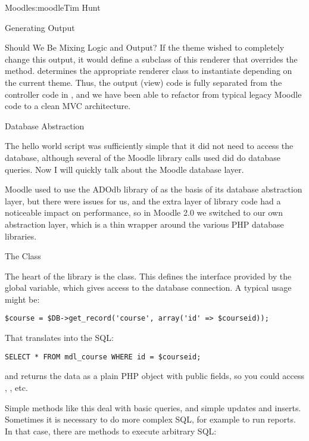 \begin{aosachapter}{Moodle}{s:moodle}{Tim Hunt}
\begin{aosasect1}{Generating Output}
\begin{aosasect2}{Should We Be Mixing Logic and Output?}
If the theme wished to completely change this output, it would define
a subclass of this renderer that overrides the 
method.  determines the
appropriate renderer class to instantiate depending on the current
theme. Thus, the output (view) code is fully separated from the
controller code in , and we have been able to refactor
from typical legacy Moodle code to a clean MVC architecture.

\end{aosasect2}

\end{aosasect1}

\begin{aosasect1}{Database Abstraction}

The hello world script was sufficiently simple that it did not need to
access the database, although several of the Moodle library calls used
did do database queries. Now I will quickly talk about the Moodle
database layer.

Moodle used to use the ADOdb library of as the basis of its database
abstraction layer, but there were issues for us, and the extra layer
of library code had a noticeable impact on performance, so in Moodle
2.0 we switched to our own abstraction layer, which is a thin wrapper
around the various PHP database libraries.

\begin{aosasect2}{The  Class}

The heart of the library is the  class. This
defines the interface provided by the  global variable,
which gives access to the database connection. A typical usage might
be:

\begin{verbatim}
$course = $DB->get_record('course', array('id' => $courseid));
\end{verbatim}

That translates into the SQL:

\begin{verbatim}
SELECT * FROM mdl_course WHERE id = $courseid;
\end{verbatim}

\noindent
and returns the data as a plain PHP object with public fields, so you
could access ,
, etc.

Simple methods like this deal with basic queries, and simple updates
and inserts. Sometimes it is necessary to do more complex SQL, for
example to run reports. In that case, there are methods to execute
arbitrary SQL:


\end{aosasect2}
\end{aosasect1}
\end{aosachapter}
